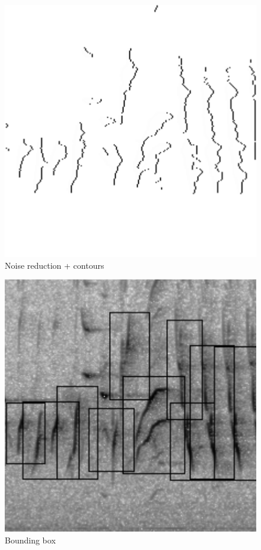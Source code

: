 \documentclass[t, xcolor={dvipsnames}]{beamer}
\begin{document}
\begin{frame}[fragile]
\begin{figure}[!tbp]
\begin{minipage}[c]{0.3\textwidth}
        \includegraphics[width=\textwidth]{img/contours}\\
        {\tiny Noise reduction + contours}
      \end{minipage}
      \hfill
      \begin{minipage}[c]{0.3\textwidth}
        \includegraphics[width=\textwidth]{img/detected-features}\\
        {\tiny Bounding box}
      \end{minipage}
    \end{figure}
\end{frame}
\end{document}

